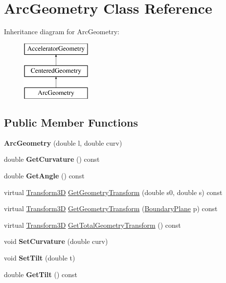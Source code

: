 \hypertarget{classArcGeometry}{}\section{Arc\+Geometry Class Reference}
\label{classArcGeometry}
Inheritance diagram for Arc\+Geometry\+:\begin{figure}[H]
\begin{center}
\leavevmode
\includegraphics[height=3.000000cm]{classArcGeometry}
\end{center}
\end{figure}
\subsection*{Public Member Functions}
\begin{DoxyCompactItemize}
\item 
\mbox{\label{classArcGeometry_ab2831b04e62efcd40d0f2f14985828f0}} 
{\bfseries Arc\+Geometry} (double l, double curv)
\item 
\mbox{\label{classArcGeometry_a0a285ce6fb24e94c734be8529f33f023}} 
double {\bfseries Get\+Curvature} () const
\item 
\mbox{\label{classArcGeometry_ab8816547aaf9ef2993af2daee51758e1}} 
double {\bfseries Get\+Angle} () const
\item 
virtual \hyperlink{classTransform3D}{Transform3D} \hyperlink{classArcGeometry_affd534869f6f79b4b271a07b51145b7c}{Get\+Geometry\+Transform} (double s0, double s) const
\item 
virtual \hyperlink{classTransform3D}{Transform3D} \hyperlink{classArcGeometry_aaa665b9dba9b879f38cb5e4a97967533}{Get\+Geometry\+Transform} (\hyperlink{classAcceleratorGeometry_a5c1661938176102f235836f5a8be6034}{Boundary\+Plane} p) const
\item 
virtual \hyperlink{classTransform3D}{Transform3D} \hyperlink{classArcGeometry_aceed7dd7294528003f4bd9f624ef6c9b}{Get\+Total\+Geometry\+Transform} () const
\item 
\mbox{\label{classArcGeometry_afced48a170ee36a2a87277148e3617c1}} 
void {\bfseries Set\+Curvature} (double curv)
\item 
\mbox{\label{classArcGeometry_a4a41e90600cbd47c308df598438e99a0}} 
void {\bfseries Set\+Tilt} (double t)
\item 
\mbox{\label{classArcGeometry_a339d9b840cb94a4aef516989e3149ed2}} 
double {\bfseries Get\+Tilt} () const
\end{DoxyCompactItemize}
